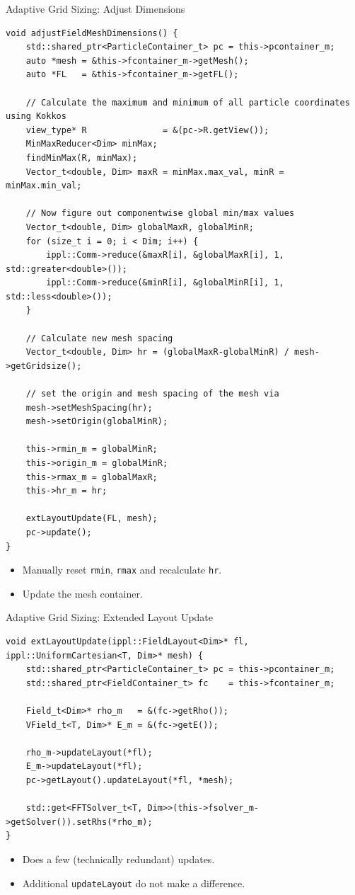 \begin{frame}[fragile]{Adaptive Grid Sizing: Adjust Dimensions}
\begin{lstlisting}
void adjustFieldMeshDimensions() {
    std::shared_ptr<ParticleContainer_t> pc = this->pcontainer_m;
    auto *mesh = &this->fcontainer_m->getMesh();
    auto *FL   = &this->fcontainer_m->getFL();

    // Calculate the maximum and minimum of all particle coordinates using Kokkos
    view_type* R               = &(pc->R.getView());
    MinMaxReducer<Dim> minMax;
    findMinMax(R, minMax); 
    Vector_t<double, Dim> maxR = minMax.max_val, minR = minMax.min_val;
    
    // Now figure out componentwise global min/max values
    Vector_t<double, Dim> globalMaxR, globalMinR;
    for (size_t i = 0; i < Dim; i++) {
        ippl::Comm->reduce(&maxR[i], &globalMaxR[i], 1, std::greater<double>());
        ippl::Comm->reduce(&minR[i], &globalMinR[i], 1, std::less<double>());
    }

    // Calculate new mesh spacing 
    Vector_t<double, Dim> hr = (globalMaxR-globalMinR) / mesh->getGridsize(); 
    
    // set the origin and mesh spacing of the mesh via
    mesh->setMeshSpacing(hr);
    mesh->setOrigin(globalMinR); 

    this->rmin_m = globalMinR;
    this->origin_m = globalMinR;
    this->rmax_m = globalMaxR;
    this->hr_m = hr;

    extLayoutUpdate(FL, mesh);
    pc->update();
}
\end{lstlisting}
    \begin{itemize}
        \item Manually reset \verb|rmin|, \verb|rmax| and recalculate \verb|hr|.
        \item Update the mesh container.
    \end{itemize}
\end{frame}


\begin{frame}[fragile]{Adaptive Grid Sizing: Extended Layout Update}
\begin{lstlisting}
void extLayoutUpdate(ippl::FieldLayout<Dim>* fl, ippl::UniformCartesian<T, Dim>* mesh) {
    std::shared_ptr<ParticleContainer_t> pc = this->pcontainer_m;
    std::shared_ptr<FieldContainer_t> fc    = this->fcontainer_m;

    Field_t<Dim>* rho_m   = &(fc->getRho());
    VField_t<T, Dim>* E_m = &(fc->getE());

    rho_m->updateLayout(*fl);
    E_m->updateLayout(*fl);
    pc->getLayout().updateLayout(*fl, *mesh);
    
    std::get<FFTSolver_t<T, Dim>>(this->fsolver_m->getSolver()).setRhs(*rho_m);
}
\end{lstlisting}
    \begin{itemize}
        \item Does a few (technically redundant) updates.
        \item Additional \verb|updateLayout| do not make a difference.
    \end{itemize}
\end{frame}




